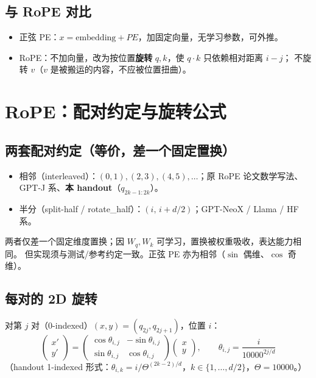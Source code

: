 \documentclass[12pt]{ctexart}
\begin{document}
\subsection{与 RoPE 对比}
\begin{itemize}
  \item 正弦 PE：$x = \text{embedding} + PE$，加固定向量，无学习参数，可外推。
  \item RoPE：不加向量，改为按位置\textbf{旋转} $q,k$，使 $q\cdot k$ 只依赖相对距离 $i-j$；
        不旋转 $v$（$v$ 是被搬运的内容，不应被位置扭曲）。
\end{itemize}

\section{RoPE：配对约定与旋转公式}

\subsection{两套配对约定（等价，差一个固定置换）}
\begin{itemize}
  \item 相邻（interleaved）：$(0,1),(2,3),(4,5),\dots$；原 RoPE 论文数学写法、GPT-J 系、\textbf{本 handout}（$q_{2k-1:2k}$）。
  \item 半分（split-half / rotate\_half）：$(i,\,i+d/2)$；GPT-NeoX / Llama / HF 系。
\end{itemize}
两者仅差一个固定维度置换；因 $W_q,W_k$ 可学习，置换被权重吸收，表达能力相同。
但实现须与测试/参考约定一致。正弦 PE 亦为相邻（$\sin$ 偶维、$\cos$ 奇维）。

\subsection{每对的 2D 旋转}
对第 $j$ 对（0-indexed）$(x,y)=(q_{2j},q_{2j+1})$，位置 $i$：
\[
\begin{pmatrix}x'\\ y'\end{pmatrix}
=
\begin{pmatrix}\cos\theta_{i,j} & -\sin\theta_{i,j}\\ \sin\theta_{i,j} & \cos\theta_{i,j}\end{pmatrix}
\begin{pmatrix}x\\ y\end{pmatrix},
\qquad
\theta_{i,j}=\frac{i}{10000^{2j/d}}
\]
（handout 1-indexed 形式：$\theta_{i,k}=i/\Theta^{(2k-2)/d}$，$k\in\{1,\dots,d/2\}$，$\Theta=10000$。）
\end{document}
